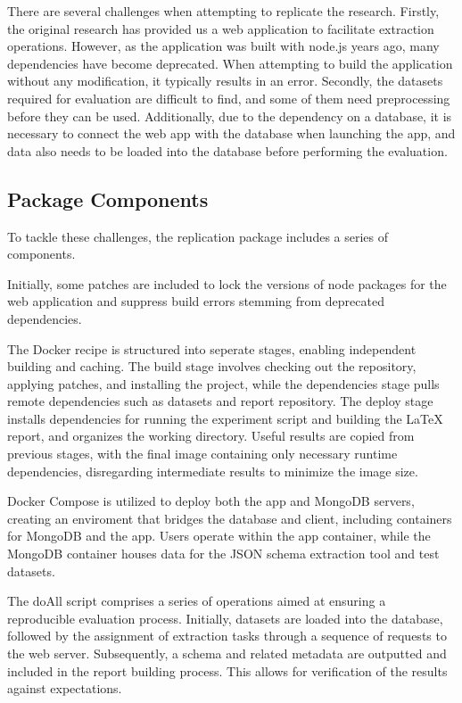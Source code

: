\documentclass[sigconf, nonacm]{acmart}
\begin{document}
There are several challenges when attempting to replicate the research. Firstly, the original research has provided us a web application to facilitate extraction operations. However, as the application was built with node.js years ago, many dependencies have become deprecated. When attempting to build the application without any modification, it typically results in an error. Secondly, the datasets required for evaluation are difficult to find, and some of them need preprocessing before they can be used. Additionally, due to the dependency on a database, it is necessary to connect the web app with the database when launching the app, and data also needs to be loaded into the database before performing the evaluation.

\subsection{Package Components}

To tackle these challenges, the replication package includes a series of components.

Initially, some patches are included to lock the versions of node packages for the web application and suppress build errors stemming from deprecated dependencies.

The Docker recipe is structured into seperate stages, enabling independent building and caching. The build stage involves checking out the repository, applying patches, and installing the project, while the dependencies stage pulls remote dependencies such as datasets and report repository. The deploy stage installs dependencies for running the experiment script and building the LaTeX report, and organizes the working directory. Useful results are copied from previous stages, with the final image containing only necessary runtime dependencies, disregarding intermediate results to minimize the image size.

Docker Compose is utilized to deploy both the app and MongoDB servers, creating an enviroment that bridges the database and client, including containers for MongoDB and the app. Users operate within the app container, while the MongoDB container houses data for the JSON schema extraction tool and test datasets.

The doAll script comprises a series of operations aimed at ensuring a reproducible evaluation process. Initially, datasets are loaded into the database, followed by the assignment of extraction tasks through a sequence of requests to the web server. Subsequently, a schema and related metadata are outputted and included in the report building process. This allows for verification of the results against expectations.
\end{document}
